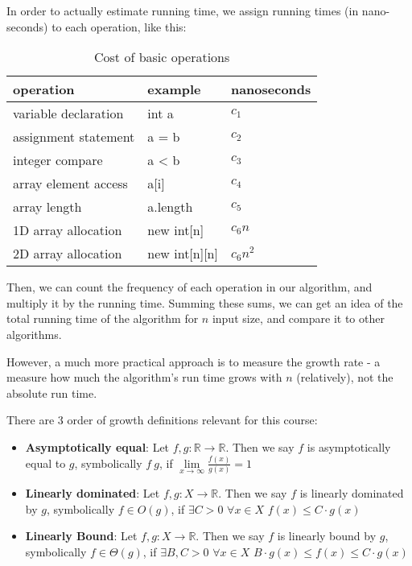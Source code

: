 \documentclass{article}
\begin{document}
In order to actually estimate running time, we assign running times (in nano-seconds) to each operation, like this:

\begin{table}[h]
\centering
\begin{tabular}{|l|l|l|}
\hline
\textbf{operation} & \textbf{example} & \textbf{nanoseconds} \\ \hline
variable declaration & int a & $c_1$   \\ \hline
assignment statement & a = b & $c_2$ \\ \hline
integer compare & a < b & $c_3$ \\ \hline
array element access & a[i] & $c_4$ \\ \hline
array length & a.length & $c_5$ \\ \hline
1D array allocation & new int[n] & $c_6$$n$ \\ \hline
2D array allocation & new int[n][n] & $c_6$$n^2$ \\ \hline
\end{tabular}
\caption{Cost of basic operations}
\label{Cost of basic operations}
\end{table}

Then, we can count the frequency of each operation in our algorithm, and multiply it by the running time. Summing these sums, we can get an idea of the total running time of the algorithm for $n$ input size, and compare it to other algorithms.

However, a much more practical approach is to measure the growth rate - a measure how much the algorithm's run time grows with $n$ (relatively), not the absolute run time.

There are 3 order of growth definitions relevant for this course:

\begin{itemize}
 \item \textbf{Asymptotically equal}: Let $f, g: \mathbb{R} \rightarrow \mathbb{R}$. Then we say $f$ is asymptotically equal to $g$, symbolically $f~g$, if $\lim\limits_{x\rightarrow \infty} \frac {f(x)} {g(x)} = 1$
 \item \textbf{Linearly dominated}: Let $f, g: X \rightarrow \mathbb{R}$. Then we say $f$ is linearly dominated by $g$, symbolically $f \in O(g)$, if $\exists C>0$ $\forall x \in X$ $f(x) \leq C \cdot g(x)$
 \item \textbf{Linearly Bound}:  Let $f, g: X \rightarrow \mathbb{R}$. Then we say $f$ is linearly bound by $g$, symbolically $f \in \Theta(g)$, if $\exists B,C>0$ $\forall x \in X$ $B \cdot g(x) \leq f(x) \leq C \cdot g(x)$
\end{itemize}
\end{document}
